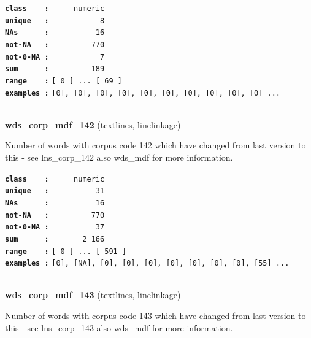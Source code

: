 \documentclass[]{article}
\begin{document}
\textbf{\texttt{class\ \ \ \ :}} \texttt{~~~~~numeric}\\
\textbf{\texttt{unique\ \ \ :}} \texttt{~~~~~~~~~~~8}\\
\textbf{\texttt{NAs\ \ \ \ \ \ :}} \texttt{~~~~~~~~~~16}\\
\textbf{\texttt{not-NA\ \ \ :}} \texttt{~~~~~~~~~770}\\
\textbf{\texttt{not-0-NA\ :}} \texttt{~~~~~~~~~~~7}\\
\textbf{\texttt{sum\ \ \ \ \ \ :}} \texttt{~~~~~~~~~189}\\
\textbf{\texttt{range\ \ \ \ :}}
\texttt{{[}\ 0\ {]}\ ...\ {[}\ 69\ {]}}\\
\textbf{\texttt{examples\ :}}
\texttt{{[}0{]},\ {[}0{]},\ {[}0{]},\ {[}0{]},\ {[}0{]},\ {[}0{]},\ {[}0{]},\ {[}0{]},\ {[}0{]},\ {[}0{]}\ ...}\\

~

\textbf{wds\_corp\_mdf\_142} (textlines, linelinkage)

Number of words with corpus code 142 which have changed from last
version to this - see lns\_corp\_142 also wds\_mdf for more information.

\textbf{\texttt{class\ \ \ \ :}} \texttt{~~~~~numeric}\\
\textbf{\texttt{unique\ \ \ :}} \texttt{~~~~~~~~~~31}\\
\textbf{\texttt{NAs\ \ \ \ \ \ :}} \texttt{~~~~~~~~~~16}\\
\textbf{\texttt{not-NA\ \ \ :}} \texttt{~~~~~~~~~770}\\
\textbf{\texttt{not-0-NA\ :}} \texttt{~~~~~~~~~~37}\\
\textbf{\texttt{sum\ \ \ \ \ \ :}} \texttt{~~~~~~~2~166}\\
\textbf{\texttt{range\ \ \ \ :}}
\texttt{{[}\ 0\ {]}\ ...\ {[}\ 591\ {]}}\\
\textbf{\texttt{examples\ :}}
\texttt{{[}0{]},\ {[}NA{]},\ {[}0{]},\ {[}0{]},\ {[}0{]},\ {[}0{]},\ {[}0{]},\ {[}0{]},\ {[}0{]},\ {[}55{]}\ ...}\\

~

\textbf{wds\_corp\_mdf\_143} (textlines, linelinkage)

Number of words with corpus code 143 which have changed from last
version to this - see lns\_corp\_143 also wds\_mdf for more information.
\end{document}
